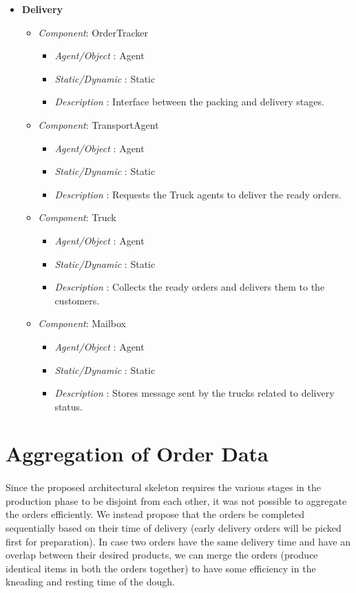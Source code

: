 \documentclass[11pt, a4paper]{article}
\begin{document}
\begin{itemize}
	\item \textbf{Delivery}
	\begin{itemize}
	\item \textit{Component}: OrderTracker
	\begin{itemize}
		\item \textit{Agent/Object} : Agent
		\item \textit{Static/Dynamic} : Static
		\item \textit{Description} : Interface between the packing and delivery stages.
	\end{itemize}
	\item \textit{Component}: TransportAgent
	\begin{itemize}
		\item \textit{Agent/Object} : Agent
		\item \textit{Static/Dynamic} : Static
		\item \textit{Description} : Requests the Truck agents to deliver the ready orders.
	\end{itemize}
	\item \textit{Component}: Truck
	\begin{itemize}
		\item \textit{Agent/Object} : Agent
		\item \textit{Static/Dynamic} : Static
		\item \textit{Description} : Collects the ready orders and delivers them to the customers.
	\end{itemize}
	\item \textit{Component}: Mailbox
	\begin{itemize}
		\item \textit{Agent/Object} : Agent
		\item \textit{Static/Dynamic} : Static
		\item \textit{Description} : Stores message sent by the trucks related to delivery status.
	\end{itemize}
	\end{itemize}
\end{itemize}


\newpage
\section{Aggregation of Order Data}
\paragraph{}
Since the proposed architectural skeleton requires the various stages in the production phase to be disjoint from each other, it was not possible to aggregate the orders efficiently. We instead propose that the orders be completed sequentially based on their time of delivery (early delivery orders will be picked first for preparation). In case two orders have the same delivery time and have an overlap between their desired products, we can merge the orders (produce identical items in both the orders together) to have some efficiency in the kneading and resting time of the dough. 
\end{document}
